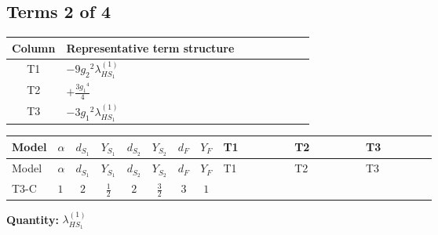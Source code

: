 \documentclass[8pt]{article}
\begin{document}
\begin{landscape}
\subsection*{Terms 2 of 4}
\begin{center}
\begin{tabular}{@{}c >{\raggedright\arraybackslash}p{0.82\linewidth}@{}}
\toprule
Column & Representative term structure \\
\midrule
T1 & \(\displaystyle -9 {g_2}^2 {\lambda_{HS_1}^{(1)}}\) \\
\midrule
T2 & \(\displaystyle +\frac{3 {g_1}^4}{4}\) \\
\midrule
T3 & \(\displaystyle -3 {g_1}^2 {\lambda_{HS_1}^{(1)}}\) \\
\midrule
\bottomrule
\end{tabular}
\end{center}
\smallskip
\tiny
\begin{longtable}{@{}llcccccc >{\raggedright\arraybackslash}p{0.21\linewidth} >{\raggedright\arraybackslash}p{0.21\linewidth} >{\raggedright\arraybackslash}p{0.21\linewidth}@{}}
\toprule
Model & $\alpha$ & $d_{S_1}$ & $Y_{S_1}$ & $d_{S_2}$ & $Y_{S_2}$ & $d_F$ & $Y_F$ & T1 & T2 & T3 \\
\midrule
\endfirsthead
\toprule
Model & $\alpha$ & $d_{S_1}$ & $Y_{S_1}$ & $d_{S_2}$ & $Y_{S_2}$ & $d_F$ & $Y_F$ & T1 & T2 & T3 \\
\midrule
\endhead
T3-C & $1$ & $2$ & $\frac{1}{2}$ & $2$ & $\frac{3}{2}$ & $3$ & $1$ & \scriptsize\adjustbox{max width=\linewidth}{$\begin{gathered} -9 {g_2}^2 {\lambda_{HS_1}^{(1)}}\end{gathered}$} & \scriptsize\adjustbox{max width=\linewidth}{$\begin{gathered} +\frac{3 {g_1}^4}{4}\end{gathered}$} & \scriptsize\adjustbox{max width=\linewidth}{$\begin{gathered} -3 {g_1}^2 {\lambda_{HS_1}^{(1)}}\end{gathered}$} \\
\midrule
\bottomrule
\end{longtable}
\clearpage
\noindent\textbf{Quantity: }$\lambda_{HS_1}^{(1)}$\par\smallskip

\end{landscape}
\end{document}
